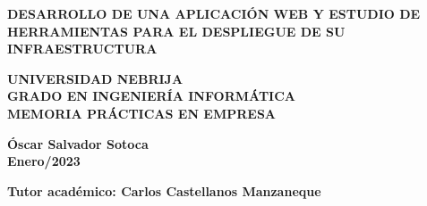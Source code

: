 \documentclass[11pt]{article}
\begin{document}
		\begin{titlepage}
		{\color{white}{.}}
		\linebreak
		\linebreak
		
		\centering
		\linebreak
		\vspace{3cm}
		
		{\LARGE\textbf{\color{RojoNebrija}DESARROLLO DE UNA APLICACIÓN WEB Y ESTUDIO DE HERRAMIENTAS PARA EL DESPLIEGUE DE SU INFRAESTRUCTURA}\par}
		\vspace{2cm}
		
		{\Large \textbf{\color{black}UNIVERSIDAD NEBRIJA \\ GRADO EN INGENIERÍA INFORMÁTICA \\ MEMORIA PRÁCTICAS EN EMPRESA}\par}
		\vspace{2cm}
		

		{\Large \textbf{ Óscar Salvador Sotoca\\ Enero/2023}\par}
		\vspace{2cm}

		{\Large \textbf{Tutor académico: Carlos Castellanos Manzaneque}\par}
		\vspace{2cm}
						
	\end{titlepage}


\tableofcontents

\clearpage
\listoffigures
\end{document}
